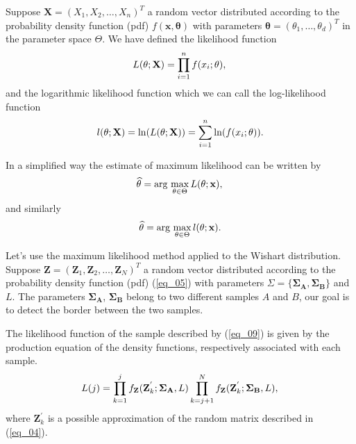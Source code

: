 \documentclass[conference]{IEEEtran}
\begin{document}
{{{{Suppose $\mathbf{X}=(X_1,X_2,\dots,X_n)^T$ a random vector distributed according to the probability density function (pdf) $f(\mathbf{x},\mathbf{\theta})$ with parameters $\mathbf{\theta}=(\theta_1,\dots,\theta_d)^T$ in the parameter space $\Theta$. We have defined the likelihood function
\begin{equation*}
    L(\theta;\mathbf{X}) = \prod_{i=1}^{n}f(x_i;\theta), \\
\end{equation*}
and the logarithmic likelihood function which we can call the log-likelihood function
\begin{equation}\label{eq_09}
	l(\theta;\mathbf{X})= \ln(L(\theta;\mathbf{X})) = \sum_{i=1}^{n}\ln(f(x_i;\theta)). \\
\end{equation}

In a simplified way the estimate of maximum likelihood can be written by 
\begin{equation*}
    \widehat{\theta}= \text{arg}\,\max\limits_{\theta\in\Theta}L(\theta;\mathbf{x}),\\
\end{equation*}
and similarly
\begin{equation*}
    \widehat{\theta}= \text{arg}\,\max\limits_{\theta\in\Theta}l(\theta;\mathbf{x}).\\
\end{equation*}

Let's use the maximum likelihood method applied to the Wishart distribution. Suppose $\mathbf{Z}=(\mathbf{Z}_1,\mathbf{Z}_2,\dots,\mathbf{Z}_N)^T$ a random vector distributed according to the probability density function (pdf) (\ref{eq_05}) with parameters $\Sigma=\{\mathbf{\Sigma_A}, \mathbf{\Sigma_B}\}$ and $L$. The parameters $\mathbf{\Sigma_A}$, $\mathbf{\Sigma_B}$ belong to two different samples $A$ and $B$, our goal is to detect the border between the two samples.

The likelihood function of the sample described by (\ref{eq_09}) is given by the production equation of the density functions, respectively associated with each sample.
\begin{equation}\label{eq_10}
	L(j)=\prod_{k=1}^{j}f_{\mathbf{Z}}(\mathbf{Z}_{k}^{'};\mathbf{\Sigma_{A}},L) \prod_{k=j+1}^{N}f_{\mathbf{Z}}(\mathbf{Z}_{k}^{'};\mathbf{\Sigma_{B}},L), \\
\end{equation}
where $\mathbf{Z}_{k}^{'}$ is a possible approximation of the random matrix described in (\ref{eq_04}).

}}}}
\end{document}
